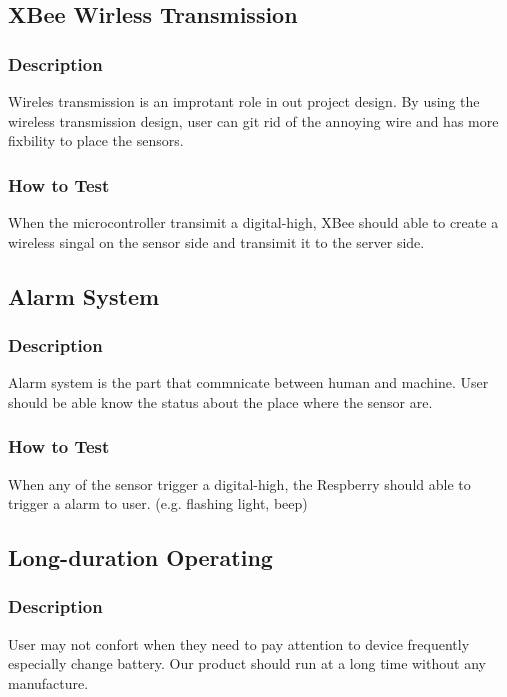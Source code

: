 \documentclass[letterpaper,12pt,notitlepage]{article}
\begin{document}
	\subsection{XBee Wirless Transmission}
		\subsubsection{Description}
			\par Wireles transmission is an improtant role in out project design. By using the wireless 
			transmission design, user can git rid of the annoying wire and has more fixbility to place the sensors. 
		\subsubsection{How to Test}
			\par When the microcontroller transimit a digital-high, XBee should able to create a wireless singal 
			on the sensor side and transimit it to the server side. 
	
	\subsection{Alarm System}
		\subsubsection{Description}
			\par Alarm system is the part that commnicate between human and machine. User should be able know the 
			status about the place where the sensor are. 
		\subsubsection{How to Test}
			\par When any of the sensor trigger a digital-high, the Respberry should able to trigger a alarm to user. 
			(e.g. flashing light, beep)

	\subsection{Long-duration Operating}
		\subsubsection{Description}
			\par User may not confort when they need to pay attention to device frequently especially change battery. 
			Our product should run at a long time without any manufacture. 
\end{document}
